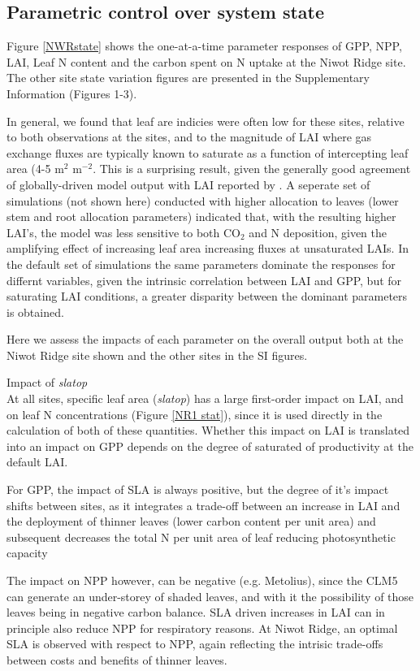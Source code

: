 \documentclass[draft,linenumbers]{agujournal}
\begin{document}
\subsection{Parametric control over system state}
Figure \ref{NWRstate} shows the one-at-a-time parameter responses of GPP, NPP, LAI, Leaf N content and the carbon spent on N uptake at the Niwot Ridge site. The other site state variation figures are presented in the Supplementary Information (Figures 1-3).

In general, we found that leaf are indicies were often low for these sites, relative to both observations at the sites, and to the magnitude of LAI where gas exchange fluxes are typically known  to saturate as a function of intercepting leaf area (4-5 m$^{2}$ m$^{-2}$. This is a surprising result, given the generally good agreement of globally-driven model output with LAI reported by \cite{lawrence2018}. A seperate set of simulations (not shown here) conducted with higher allocation to leaves (lower stem and root allocation parameters) indicated that, with the resulting higher LAI's, the model was less sensitive to both CO$_{2}$ and N deposition, given the amplifying effect of increasing leaf area increasing fluxes at unsaturated LAIs.  In the default set of simulations the same parameters dominate the responses for differnt variables, given the intrinsic correlation between LAI and GPP, but for saturating LAI conditions, a greater disparity between the dominant parameters is obtained. 

Here we assess the impacts of each parameter on the overall output both at the Niwot Ridge site shown and the other sites in the SI figures. 

Impact of \emph{slatop}\\
At all sites, specific leaf area (\emph{slatop}) has a large first-order impact on LAI,  and on leaf N concentrations (Figure \ref{NR1 stat}), since it is used directly in the calculation of both of these quantities.  Whether this impact on LAI is translated into an impact on GPP depends on the degree of saturated of productivity at the default LAI. 

For GPP, the impact of SLA is always positive, but the degree of it's impact shifts between sites, as it integrates a trade-off between an increase in LAI and the deployment of thinner leaves (lower carbon content per unit area) and subsequent decreases the total N per unit area of leaf reducing photosynthetic capacity 

The impact on NPP however, can be negative (e.g. Metolius), since the CLM5 can generate an under-storey of shaded leaves, and with it the possibility of those leaves being in negative carbon balance.  SLA driven increases in LAI can in principle also reduce NPP for respiratory reasons. At Niwot Ridge, an optimal SLA is observed with respect to NPP, again reflecting the intrisic trade-offs between costs and benefits of thinner leaves. 
\end{document}
